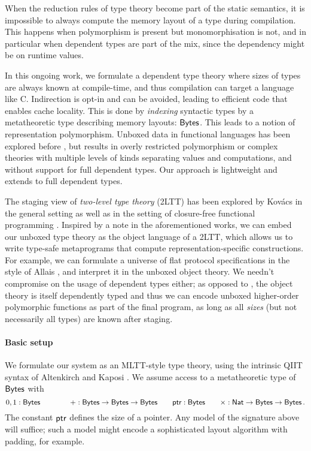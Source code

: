 When the reduction rules of type theory become part of the static semantics, it
is impossible to always compute the memory layout of a type during compilation.
This happens when polymorphism is present but monomorphisation is not, and in
particular when dependent types are part of the mix, since the dependency might
be on runtime values.

In this ongoing work, we formulate a dependent type theory where sizes of types
are always known at compile-time, and thus compilation can target a language
like C. Indirection is opt-in and can be avoided, leading to efficient code that
enables cache locality. This is done by \emph{indexing} syntactic types by a
metatheoretic type describing memory layouts: $\textsf{Bytes}$. This leads to a notion
of representation polymorphism. Unboxed data in functional languages has been
explored before \cite{Jones1991-ik,Downen2024-nk}, but results in overly restricted
polymorphism or complex theories with multiple levels of kinds separating values and computations, and without
support for full dependent types. Our approach is lightweight and extends to
full dependent types.

The staging view of \emph{two-level type theory} (2LTT) \cite{Annenkov2023-vk}
has been explored by Kov\'acs in the general setting \cite{Kovacs2022-rf} as
well as in the setting of closure-free functional programming
\cite{Kovacs2024-hn}. Inspired by a note in the aforementioned works, we can embed
our unboxed type theory as the object language of a 2LTT, which allows us to
write type-safe metaprograms that compute representation-specific constructions.
For example, we can formulate a universe of flat protocol specifications in the
style of Allais \cite{Allais2023-zq}, and interpret it in the unboxed object
theory.
We needn't compromise on the usage of dependent types either; as opposed to
\cite{Kovacs2024-hn}, the object theory is itself dependently typed and thus we
can encode unboxed higher-order polymorphic functions as part of the final
program, as long as all \emph{sizes} (but not necessarily all types) are known after staging.

\paragraph{Basic setup}
We formulate our system as an MLTT-style type theory, using the intrinsic QIIT
syntax of Altenkirch and Kaposi \cite{Altenkirch2016-zc}.
We assume access to a metatheoretic type of
\(\textsf{Bytes}\) with
\[
0, 1 : \textsf{Bytes} \qquad \qquad + : \textsf{Bytes} \to \textsf{Bytes} \to \textsf{Bytes} \qquad \textsf{ptr} : \textsf{Bytes} \qquad \times : \textsf{Nat} \to \textsf{Bytes} \to \textsf{Bytes} \,.
\]
The constant \(\textsf{ptr}\) defines the size of a pointer. Any model of
the signature above will suffice; such a model might encode a sophisticated
layout algorithm with padding, for example.


